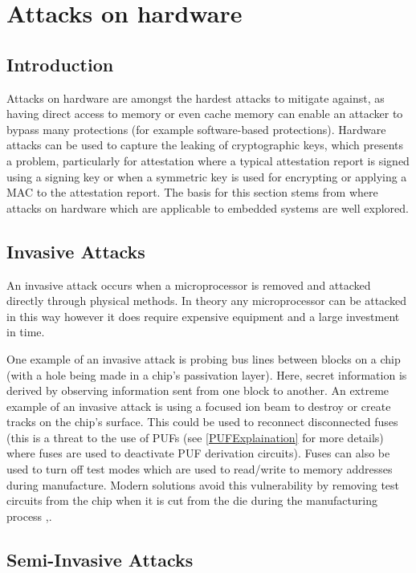 \UseRawInputEncoding
\section{Attacks on hardware} \label{hardwareAttacks}
\subsection{Introduction}

Attacks on hardware are amongst the hardest attacks to mitigate against, as having direct access to memory or even cache memory can enable an attacker to bypass many protections (for example software-based protections). Hardware attacks can be used to capture the leaking of cryptographic keys, which presents a problem, particularly for attestation where a typical attestation report is signed using a signing key or when a symmetric key is used for encrypting or applying a MAC to the attestation report. The basis for this section stems from \cite{MayesKeithE2008SCTS} where attacks on hardware which are applicable to embedded systems are well explored.

\subsection{Invasive Attacks}
An invasive attack occurs when a microprocessor is removed and attacked directly through physical methods. In theory any microprocessor can be attacked in this way however it does require expensive equipment and a large investment in time.

One example of an invasive attack is probing bus lines between blocks on a chip (with a hole being made in a chip's passivation layer). Here, secret information is derived by observing information sent from one block to another. An extreme example of an invasive attack is using a focused ion beam to destroy or create tracks on the chip's surface. This could be used to reconnect disconnected fuses (this is a threat to the use of PUFs (see \ref{PUFExplaination} for more details) where fuses are used to deactivate PUF derivation circuits). Fuses can also be used to turn off test modes which are used to read\slash write to memory addresses during manufacture. Modern solutions avoid this vulnerability by removing test circuits from the chip when it is cut from the die during the manufacturing process \cite{Anderson1996},\cite{Kommerling1999}.

\subsection{Semi-Invasive Attacks}

